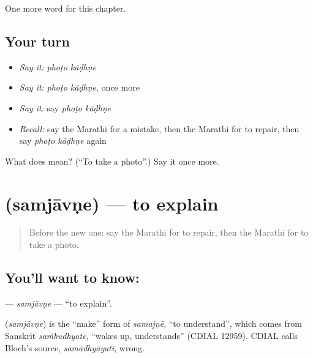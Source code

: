 \begin{grammarlens}[title={What you've built}]
One more word for this chapter.
\end{grammarlens}

\subsection*{Your turn}
\begin{itemize}
\raggedright
  \item \emph{Say it:} \emph{phoṭo kāḍhṇe}
  \item \emph{Say it:} \emph{phoṭo kāḍhṇe}, once more
  \item \emph{Say it:} say \emph{phoṭo kāḍhṇe}
  \item \emph{Recall:} say the Marathi for a mistake, then the Marathi for to repair, then say \emph{phoṭo kāḍhṇe} again
\end{itemize}

\begin{tcolorbox}[breakable,colback=teal!4,colframe=teal!35!black,title={Before you move on}]
What does   mean? (\textquotedblleft{}To take a photo\textquotedblright{}.) Say it once more.
\end{tcolorbox}
\section[\texorpdfstring{\mr{समजावणे} (samjāvṇe)}{समजावणे (samjāvṇe)}]{ (samjāvṇe) — to explain}

\label{lesson:MR-C223-samjavne}



\begin{quote}
Before the new one: say the Marathi for to repair, then the Marathi for to take a photo.
\end{quote}

\subsection*{You'll want to know: }
\textbf{} — \emph{samjāvṇe} — \textquotedblleft{}to explain\textquotedblright{}.

\begin{cousinweb}
\textbf{} (\emph{samjāvṇe}) is the \textquotedblleft{}make\textquotedblright{} form of \emph{samajṇẽ}, \textquotedblleft{}to understand\textquotedblright{}, which comes from Sanskrit \emph{saṁbudhyate}, \textquotedblleft{}wakes up, understands\textquotedblright{} (CDIAL 12959). CDIAL calls Bloch's source, \emph{samādhyāyati}, wrong.
\end{cousinweb}

